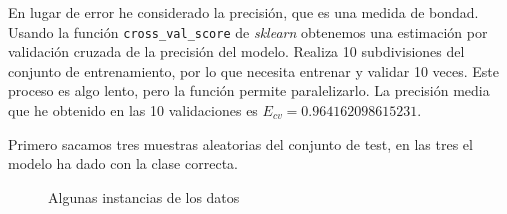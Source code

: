 \documentclass[a4]{article}
\begin{document}
En lugar de error he considerado la precisión, que es una medida de
bondad. Usando la función \texttt{cross\_val\_score} de
\textit{sklearn} obtenemos una estimación por validación cruzada de la
precisión del modelo. Realiza 10 subdivisiones del conjunto de
entrenamiento, por lo que necesita entrenar y validar 10 veces. Este
proceso es algo lento, pero la función permite paralelizarlo. La
precisión media que he obtenido en las 10 validaciones es
$E_{cv} = 0.964162098615231$.

Primero sacamos tres muestras aleatorias del conjunto de test, en
las tres el modelo ha dado con la clase correcta.

\vspace{-5mm}
\begin{figure}[H]
  \centering
  \caption{Algunas instancias de los datos}
  \label{fig:tests-samples}
\end{figure}
\vspace{-5mm}
\end{document}
